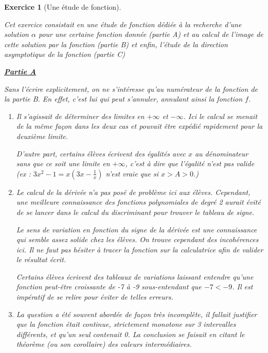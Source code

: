 \documentclass[12pt,a4paper]{article}
\theoremstyle{break}
\theoremstyle{nobreak}
\newtheorem{exercice}{Exercice}
\theoremstyle{nonumberplain}
\begin{document}
\begin{exercice}[Une étude de fonction]~

  Cet exercice consistait en une étude de fonction dédiée à la recherche
  d'une solution $\alpha$ pour une certaine fonction donnée (partie A)
  et au calcul de l'image de cette solution par la fonction (partie B)
  et enfin, l'étude de la direction asymptotique de la fonction (partie
  C)

  \noindent\textbf{\underline{Partie A}}

  Sans l'écrire explicitement, on ne s'intéresse qu'au numérateur de la
  fonction de la partie B. En effet, c'est lui qui peut s'annuler,
  annulant ainsi la fonction $f$.

  \begin{enumerate}
    \item Il s'agissait de déterminer des limites en $+\infty$ et
      $-\infty$. Ici le calcul se menait de la même façon dans les deux
      cas et pouvait être expédié rapidement pour la deuxième limite.

      D'autre part, certains élèves écrivent des égalités avec $x$ au
      dénominateur sans que ce soit une limite en $+\infty$, c'est à
      dire que l'égalité n'est pas valide (ex : $3x^2 -1 = x(3x -
      \frac1x)$ n'est vraie que si $x>A>0$.)
    \item Le calcul de la dérivée n'a pas posé de problème ici aux
      élèves. Cependant, une meilleure connaissance des fonctions
      polynomiales de degré 2 aurait évité de se lancer dans le calcul
      du discriminant pour trouver le tableau de signe.

      Le sens de variation en fonction du signe de la dérivée est une
      connaissance qui semble assez solide chez les élèves. On trouve
      cependant des incohérences ici. Il ne faut pas hésiter à tracer la
      fonction sur la calculatrice afin de valider le résultat écrit.

      Certains élèves écrivent des tableaux de variations laissant
      entendre qu'une fonction peut-être croissante de -7 à -9
      sous-entendant que $-7<-9$. Il est impératif de se relire pour
      éviter de telles erreurs.
    \item La question a été souvent abordée de façon très incomplète, il
      fallait justifier que la fonction était continue, strictement
      monotone sur 3 intervalles différents, et qu'un seul contenait 0.
      La conclusion se faisait en citant le théorème (ou son corollaire)
      des valeurs intermédiaires.


\end{enumerate}
\end{exercice}
\end{document}
